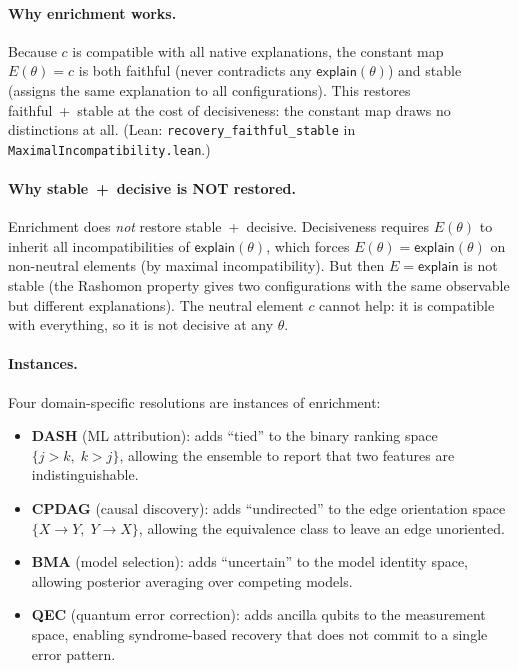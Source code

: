 \documentclass[11pt,a4paper]{article}
\begin{document}
\paragraph{Why enrichment works.}
Because $c$ is compatible with all native explanations, the constant map $E(\theta) = c$ is both faithful (never contradicts any $\mathsf{explain}(\theta)$) and stable (assigns the same explanation to all configurations).  This restores faithful~+~stable at the cost of decisiveness: the constant map draws no distinctions at all.
(Lean: \texttt{recovery\_faithful\_stable} in \texttt{MaximalIncompatibility.lean}.)

\paragraph{Why stable~+~decisive is NOT restored.}
Enrichment does \emph{not} restore stable~+~decisive.  Decisiveness requires $E(\theta)$ to inherit all incompatibilities of $\mathsf{explain}(\theta)$, which forces $E(\theta) = \mathsf{explain}(\theta)$ on non-neutral elements (by maximal incompatibility).  But then $E = \mathsf{explain}$ is not stable (the Rashomon property gives two configurations with the same observable but different explanations).  The neutral element $c$ cannot help: it is compatible with everything, so it is not decisive at any $\theta$.

\paragraph{Instances.}
Four domain-specific resolutions are instances of enrichment:
\begin{itemize}[nosep]
  \item \textbf{DASH} (ML attribution): adds ``tied'' to the binary ranking space $\{j > k, \; k > j\}$, allowing the ensemble to report that two features are indistinguishable.
  \item \textbf{CPDAG} (causal discovery): adds ``undirected'' to the edge orientation space $\{X \to Y, \; Y \to X\}$, allowing the equivalence class to leave an edge unoriented.
  \item \textbf{BMA} (model selection): adds ``uncertain'' to the model identity space, allowing posterior averaging over competing models.
  \item \textbf{QEC} (quantum error correction): adds ancilla qubits to the measurement space, enabling syndrome-based recovery that does not commit to a single error pattern.
\end{itemize}
\end{document}
